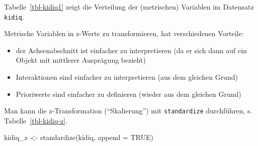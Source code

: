 \documentclass[
  a4paper,
  DIV=11]{scrreprt}
\newenvironment{Shaded}{\begin{snugshade}}{\end{snugshade}}
\newcommand{\AttributeTok}[1]{\textcolor[rgb]{0.40,0.45,0.13}{#1}}
\newcommand{\ConstantTok}[1]{\textcolor[rgb]{0.56,0.35,0.01}{#1}}
\newcommand{\FunctionTok}[1]{\textcolor[rgb]{0.28,0.35,0.67}{#1}}
\newcommand{\NormalTok}[1]{\textcolor[rgb]{0.00,0.23,0.31}{#1}}
\newcommand{\OtherTok}[1]{\textcolor[rgb]{0.00,0.23,0.31}{#1}}
\providecommand{\tightlist}{%
  \setlength{\itemsep}{0pt}\setlength{\parskip}{0pt}}\usepackage{longtable,booktabs,array}
\theoremstyle{definition}
\theoremstyle{remark}
\begin{document}
Tabelle~\ref{tbl-kidiq1} zeigt die Verteilung der (metrischen) Variablen
im Datensatz \texttt{kidiq}.

Metrische Variablen in z-Werte zu transformieren, hat verschiedenen
Vorteile:

\begin{itemize}
\tightlist
\item
  der Achsenabschnitt ist einfacher zu interpretieren (da er sich dann
  auf ein Objekt mit mittlerer Ausprägung bezieht)
\item
  Interaktionen sind einfacher zu interpretieren (aus dem gleichen
  Grund)
\item
  Prioriwerte sind einfacher zu definieren (wieder aus dem gleichen
  Grund)
\end{itemize}

Man kann die z-Transformation (``Skalierung'') mit \texttt{standardize}
durchführen, s. Tabelle~\ref{tbl-kidiq-z}.

\begin{Shaded}
\begin{Highlighting}[]
\NormalTok{kidiq\_z }\OtherTok{\textless{}{-}} 
  \FunctionTok{standardize}\NormalTok{(kidiq, }\AttributeTok{append =} \ConstantTok{TRUE}\NormalTok{)}
\end{Highlighting}
\end{Shaded}
\end{document}
